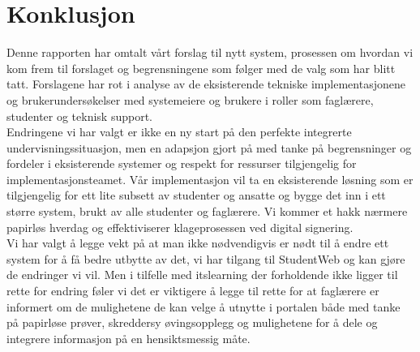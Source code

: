 \section{Konklusjon}

Denne rapporten har omtalt vårt forslag til nytt system, prosessen om hvordan vi kom frem til forslaget og begrensningene som følger med de valg som har blitt tatt. Forslagene
har rot i analyse av de eksisterende tekniske implementasjonene og brukerundersøkelser med systemeiere og brukere i roller som faglærere, studenter og teknisk support. \\ 

Endringene vi har valgt er ikke en ny start på den perfekte integrerte
undervisningssituasjon, men en adapsjon gjort på med tanke på begrensninger og fordeler i eksisterende systemer og respekt for ressurser tilgjengelig for implementasjonsteamet.
\newline \newline 
Vår implementasjon vil ta en eksisterende løsning som er tilgjengelig for ett lite subsett av studenter og ansatte og bygge det inn i ett større system, brukt av alle studenter
og faglærere. Vi kommer et hakk nærmere papirløs hverdag og effektiviserer klageprosessen ved digital signering. \\

Vi har valgt å legge vekt på at man ikke nødvendigvis er nødt til å endre ett system for å få bedre utbytte av det, vi har tilgang til StudentWeb og kan gjøre de endringer vi vil.
Men i tilfelle med itslearning der forholdende ikke ligger til rette for endring føler vi det er viktigere å legge til rette for at faglærere er informert om de mulighetene de kan velge å utnytte i portalen både med tanke på papirløse prøver, skreddersy øvingsopplegg og mulighetene for å dele og integrere informasjon på en hensiktsmessig måte.


